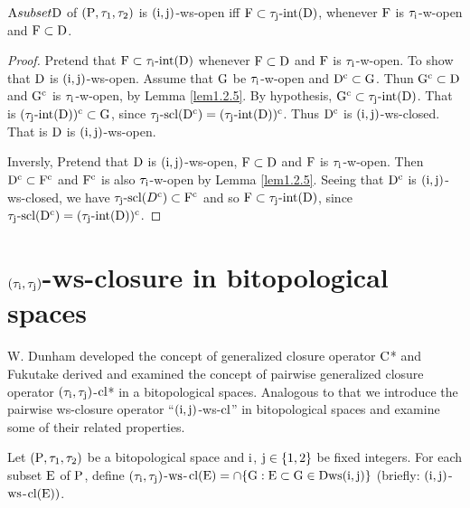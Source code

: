 \begin{thm}\label{thm7.3.6}
$\mathrm{A} subset \mathrm{D}$ of $(\mathrm{P}, \tau_1, \tau_2 )$ is $(\mathrm{i}, \mathrm{j})$-ws-open iff $\mathrm{F}\subset \tau_{\mathrm{j}}\text{-int}(\mathrm{D})$, whenever $\mathrm{F}$ is $\tau_{\mathrm{i}}$-w-open and $\mathrm{F}\subset \mathrm{D}$.
\end{thm}

\begin{proof}
Pretend that $\mathrm{F}\subset \tau_{\mathrm{i}}\text{-int}(\mathrm{D})$ whenever $\mathrm{F}\subset \mathrm{D}$ and $\mathrm{F}$ is $\tau_{\mathrm{i}}$-w-open. To show that $\mathrm{D}$ is $(\mathrm{i}, \mathrm{j})$-ws-open. Assume that $\mathrm{G}$ be $\tau_{\mathrm{i}}$-w-open and $\mathrm{D}^{\text{c}} \subset \mathrm{G}$. Thun $\mathrm{G}^{\text{c}} \subset \mathrm{D}$ and $\mathrm{G}^{\text{c}}$ is $\tau_{\mathrm{i}}$-w-open, by Lemma \ref{lem1.2.5}. By hypothesis, $\mathrm{G}^{\text{c}} \subset \tau_{\mathrm{j}}\text{-int}(\mathrm{D})$. That is $(\tau_{\mathrm{j}}\text{-int}(\mathrm{D}))^{\text{c}} \subset \mathrm{G}$, since $\tau_{\mathrm{j}}\text{-scl}(\mathrm{D}^{\text{c}})=(\tau_{\mathrm{j}}\text{-int}(\mathrm{D}))^{\text{c}}$. Thus $\mathrm{D}^{\text{c}}$ is $(\mathrm{i}, \mathrm{j})$-ws-closed. That is $\mathrm{D}$ is $(\mathrm{i}, \mathrm{j})$-ws-open. 

Inversly, Pretend that $\mathrm{D}$ is $(\mathrm{i}, \mathrm{j})$-ws-open, $\mathrm{F}\subset\mathrm{D}$ and $\mathrm{F}$ is $\tau_{\mathrm{i}}$-w-open. Then $\mathrm{D}^{\text{c}} \subset \mathrm{F}^{\text{c}}$ and $\mathrm{F}^{\text{c}}$ is also $\tau_{\mathrm{i}}$-w-open by Lemma \ref{lem1.2.5}. Seeing that $\mathrm{D}^{\text{c}}$ is $(\mathrm{i}, \mathrm{j})$-ws-closed, we have $\tau_{\mathrm{j}}\text{-scl}(D^{\text{c}}) \subset \mathrm{F}^{\text{c}}$ and so $\mathrm{F}\subset \tau_{\mathrm{j}}\text{-int}(\mathrm{D})$, since $\tau_{\mathrm{j}}\text{-scl}(\mathrm{D}^{\text{c}}) = (\tau_{\mathrm{j}}\text{-int}(\mathrm{D}))^{\text{c}}$.
\end{proof}


\section{\boldmath$(\tau_{\mathrm{i}}, \tau_{\mathrm{j}} )$-ws-closure in bitopological spaces}\label{sec7.3}

W. Dunham \cite{key33} developed the concept of generalized closure operator $\mathrm{C}$* and Fukutake \cite{key34} derived and examined the concept of pairwise generalized closure operator $(\tau_{\mathrm{i}},\tau_{\mathrm{j}} )$-$\mathrm{cl}$* in a bitopological spaces. Analogous to that we introduce the pairwise ws-closure operator ``$(\mathrm{i}, \mathrm{j})$-ws-$\mathrm{cl}$'' in bitopological spaces and examine some of their related properties.

\begin{dfn}\label{defi7.3.1}
Let $(\mathrm{P}, \tau_1, \tau_2 )$ be a bitopological space and $\mathrm{i}$, $\mathrm{j}\in\{1, 2\}$ be fixed integers. For each subset $\mathrm{E}$ of $\mathrm{P}$, define $(\tau_{\mathrm{i}}, \tau_{\mathrm{j}} )$-$\mathrm{ws}$-$\mathrm{cl}(\mathrm{E})= \cap \{\mathrm{G}: \mathrm{E} \subset \mathrm{G}\in\mathrm{D} \mathrm{ws} (\mathrm{i}, \mathrm{j})\}$ (briefly: $(\mathrm{i}, \mathrm{j})$-$\mathrm{ws}$-$\mathrm{cl}(\mathrm{E}))$.
\end{dfn}

